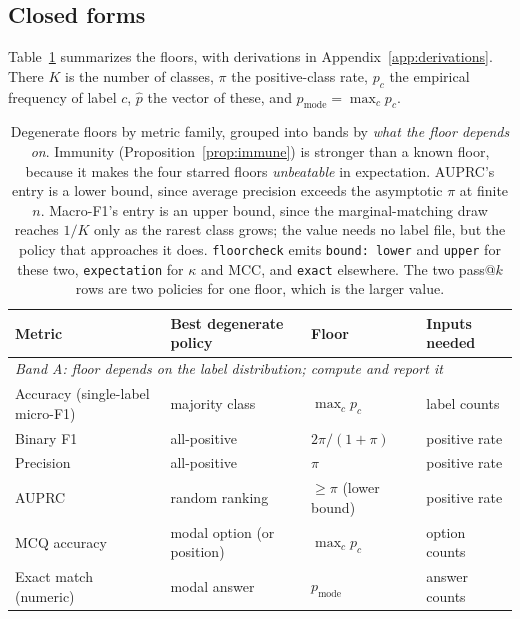 \documentclass{article}
\theoremstyle{plain}
\theoremstyle{definition}
\newcommand{\floorcheck}{\texttt{floorcheck}}
\begin{document}
\subsection{Closed forms}
\label{sec:closedforms}

Table~\ref{tab:closedforms} summarizes the floors, with derivations in Appendix~\ref{app:derivations}. There $K$ is the number of classes, $\pi$ the positive-class rate, $p_c$ the empirical frequency of label $c$, $\hat{p}$ the vector of these, and $p_{\mathrm{mode}} = \max_c p_c$.

\begin{table}[t]
  \caption{Degenerate floors by metric family, grouped into bands by \emph{what the floor depends on}. Immunity (Proposition~\ref{prop:immune}) is stronger than a known floor, because it makes the four starred floors \emph{unbeatable} in expectation. AUPRC's entry is a lower bound, since average precision exceeds the asymptotic $\pi$ at finite $n$. Macro-F1's entry is an upper bound, since the marginal-matching draw reaches $1/K$ only as the rarest class grows; the value needs no label file, but the policy that approaches it does. \floorcheck{} emits \texttt{bound: lower} and \texttt{upper} for these two, \texttt{expectation} for $\kappa$ and MCC, and \texttt{exact} elsewhere. The two pass@$k$ rows are two policies for one floor, which is the larger value.}
  \label{tab:closedforms}
  \centering
  \small
  \renewcommand{\arraystretch}{0.92}
  \setlength{\tabcolsep}{4.5pt}
  \begin{tabular}{llll}
    \toprule
    Metric & Best degenerate policy & Floor & Inputs needed \\
    \midrule
    \multicolumn{4}{l}{\emph{Band A: floor depends on the label distribution; compute and report it}} \\
    Accuracy (single-label micro-F1) & majority class & $\max_c p_c$ & label counts \\
    Binary F1 & all-positive & $2\pi/(1+\pi)$ & positive rate \\
    Precision & all-positive & $\pi$ & positive rate \\
    AUPRC & random ranking & $\ge \pi$ (lower bound) & positive rate \\
    MCQ accuracy & modal option (or position) & $\max_c p_c$ & option counts \\
    Exact match (numeric) & modal answer & $p_{\mathrm{mode}}$ & answer counts \\

\end{tabular}
\end{table}
\end{document}
